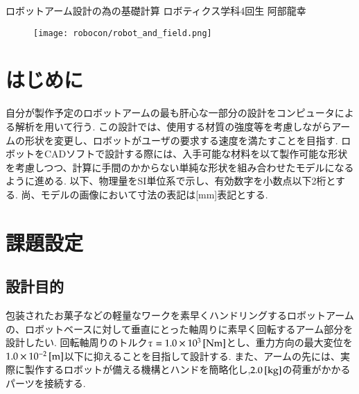 \documentclass[10pt,b5paper,papersize,dvipdfmx]{jsbook}
\begin{document}


\kaishititle%
  {ロボットアーム設計の為の基礎計算}%
  {ロボティクス学科4回生}%
  {阿部龍幸}%

\begin{figure}[htbp]
  \centering
  \texttt{[image: robocon/robot\_and\_field.png]}
\end{figure}

%
\section*{はじめに}
自分が製作予定のロボットアームの最も肝心な一部分の設計をコンピュータによる解析を用いて行う. この設計では、使用する材質の強度等を考慮しながらアームの形状を変更し、ロボットがユーザの要求する速度を満たすことを目指す. ロボットをCADソフトで設計する際には、入手可能な材料を以て製作可能な形状を考慮しつつ、計算に手間のかからない単純な形状を組み合わせたモデルになるように進める. 以下、物理量をSI単位系で示し、有効数字を小数点以下2桁とする. 尚、モデルの画像において寸法の表記は[mm]表記とする. 

%
\section{課題設定}
\subsection{設計目的}
包装されたお菓子などの軽量なワークを素早くハンドリングするロボットアームの、ロボットベースに対して垂直にとった軸周りに素早く回転するアーム部分を設計したい. 回転軸周りのトルク$\tau =1.0 \times 10^3 \tani*{Nm}$とし、重力方向の最大変位を$1.0 \times 10^{-2} \tani*{m}$以下に抑えることを目指して設計する. また、アームの先には、実際に製作するロボットが備える機構とハンドを簡略化し,$2.0 \tani*{kg}$の荷重がかかるパーツを接続する.
\end{document}
